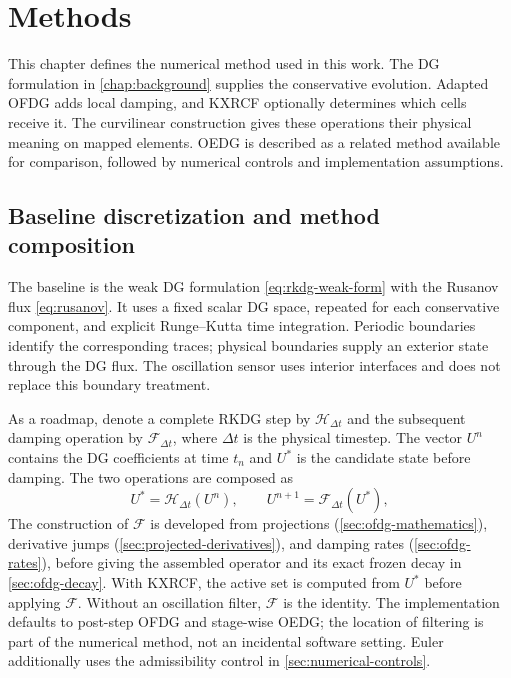 \chapter{Methods}
\label{chap:methods}
\label{chap:stabilization}
This chapter defines the numerical method used in this work. The DG
formulation in \cref{chap:background} supplies the conservative evolution.
Adapted OFDG adds local damping, and KXRCF optionally determines which cells
receive it. The curvilinear construction gives these operations their physical
meaning on mapped elements. OEDG is described as a related method available
for comparison, followed by numerical controls and implementation assumptions.

\section{Baseline discretization and method composition}
The baseline is the weak DG formulation \cref{eq:rkdg-weak-form} with the
Rusanov flux \cref{eq:rusanov}. It uses a fixed scalar DG space, repeated for
each conservative component, and explicit Runge--Kutta time integration.
Periodic boundaries identify the corresponding traces; physical boundaries
supply an exterior state through the DG flux. The oscillation sensor uses
interior interfaces and does not replace this boundary treatment.

As a roadmap, denote a complete RKDG step by $\mathcal H_{\Delta t}$ and
the subsequent damping operation by $\mathcal F_{\Delta t}$, where
$\Delta t$ is the physical timestep. The vector $U^n$ contains the DG
coefficients at time $t_n$ and $U^*$ is the candidate state before damping.
The two operations are composed as
\begin{equation}
 U^*=\mathcal H_{\Delta t}(U^n),\qquad
 U^{n+1}=\mathcal F_{\Delta t}(U^*),
\end{equation}
The construction of $\mathcal F$ is developed from projections
(\cref{sec:ofdg-mathematics}), derivative jumps
(\cref{sec:projected-derivatives}), and damping rates
(\cref{sec:ofdg-rates}), before giving the assembled operator and its exact
frozen decay in \cref{sec:ofdg-decay}. With KXRCF, the active set is computed from $U^*$ before
applying $\mathcal F$. Without an oscillation filter, $\mathcal F$ is the
identity. The implementation defaults to post-step OFDG and stage-wise OEDG;
the location of filtering is part of the numerical method, not an incidental
software setting. Euler additionally uses the admissibility control in
\cref{sec:numerical-controls}.

